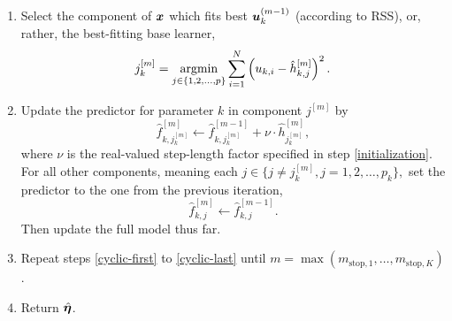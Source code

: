 \begin{algorithm}
\begin{enumerate}
    \item Select the component of $\bm{x}$ which fits best $\bm{u}^{(m-1)}_k$ (according to RSS), or, rather, the best-fitting base learner,
        \begin{equation*}
            j_k^{[m]}=\operatorname*{argmin}_{j\in\{1,2,\ldots,p\}}\sum_{i=1}^N \left(u_{k,i}-\hat{h}_{k,j}^{[m]}\right)^2.
        \end{equation*}
    \item\label{cyclic-last} Update the predictor for parameter $k$ in component $j^{[m]}$ by
        \begin{equation*}
            \hat{f}_{k,j_k^{[m]}}^{[m]}\gets\hat{f}_{k,j_k^{[m]}}^{[m-1]}+\nu\cdot\hat{h}_{j_k^{[m]}}^{[m]},
        \end{equation*}
        where $\nu$ is the real-valued step-length factor specified in step \ref{initialization}. For all other components,
        meaning each $j\in\{j\neq j_k^{[m]},j=1,2,\ldots,p_k\},$ set the predictor to the one from the previous iteration,
        \begin{equation*}
            \hat{f}_{k,j}^{[m]}\gets\hat{f}_{k,j}^{[m-1]}.
        \end{equation*}
        Then update the full model thus far.
    \item Repeat steps \ref{cyclic-first} to \ref{cyclic-last} until $m=\max(m_{\text{stop},1},\ldots,m_{\text{stop},K})$.
    \item Return $\hat{\boldsymbol{\eta}}$.
\end{enumerate}
\end{algorithm}

